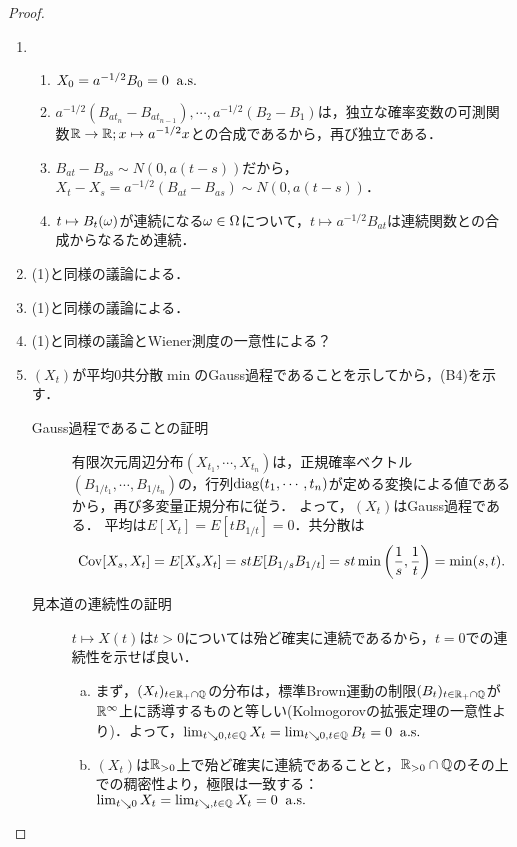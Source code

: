 \documentclass[uplatex,dvipdfmx]{jsreport}
\begin{document}
\begin{proof}\mbox{}
    \begin{enumerate}
        \item 
        \begin{enumerate}[({B}1)]
            \item $X_0=a^{-1/2}B_0=0\;\;\mathrm{a.s.}$
            \item $a^{-1/2}(B_{at_n}-B_{at_{n-1}}),\cdots,a^{-1/2}(B_{2}-B_{1})$は，独立な確率変数の可測関数$\mathbb{R}\to\mathbb{R};x\mapsto a^{-1/2}x$との合成であるから，再び独立である．
            \item $B_{at}-B_{as}\sim N(0,a(t-s))$だから，$X_t-X_s=a^{-1/2}(B_{at}-B_{as})\sim N(0,a(t-s))$．
            \item $t\mapsto B_t(\omega)$が連続になる$\omega\in\Omega$について，$t\mapsto a^{-1/2}B_{at}$は連続関数との合成からなるため連続．
        \end{enumerate}
        \item (1)と同様の議論による．
        \item (1)と同様の議論による．
        \item (1)と同様の議論とWiener測度の一意性による？
        \item $(X_t)$が平均$0$共分散$\min$のGauss過程であることを示してから，(B4)を示す．
        \begin{description}
            \item[Gauss過程であることの証明] 
            有限次元周辺分布$(X_{t_1},\cdots,X_{t_n})$は，正規確率ベクトル$(B_{1/t_1},\cdots,B_{1/t_n})$の，行列$\mathrm{diag}(t_1,\cdots,t_n)$が定める変換による値であるから，再び多変量正規分布に従う．
            よって，$(X_t)$はGauss過程である．
            平均は$E[X_t]=E[tB_{1/t}]=0$．共分散は
            \[\mathrm{Cov}[X_s,X_t]=E[X_sX_t]=stE[B_{1/s}B_{1/t}]=st\min\left(\frac{1}{s},\frac{1}{t}\right)=\min(s,t).\]
            \item[見本道の連続性の証明]
            $t\mapsto X(t)$は$t>0$については殆ど確実に連続であるから，$t=0$での連続性を示せば良い．
            \begin{enumerate}[(a)]
                \item まず，$(X_t)_{t\in\mathbb{R}_+\cap\mathbb{Q}}$の分布は，標準Brown運動の制限$(B_t)_{t\in\mathbb{R}_+\cap\mathbb{Q}}$が$\mathbb{R}^\infty$上に誘導するものと等しい(Kolmogorovの拡張定理の一意性より)．よって，$\lim_{t\searrow0,t\in\mathbb{Q}}X_t=\lim_{t\searrow0,t\in\mathbb{Q}}B_t=0\;\;\mathrm{a.s.}$
                \item $(X_t)$は$\mathbb{R}_{>0}$上で殆ど確実に連続であることと，$\mathbb{R}_{>0}\cap\mathbb{Q}$のその上での稠密性より，極限は一致する：$\lim_{t\searrow0}X_t=\lim_{t\searrow,t\in\mathbb{Q}}X_t=0\;\;\mathrm{a.s.}$
                

\end{enumerate}
\end{description}
\end{enumerate}
\end{proof}
\end{document}
